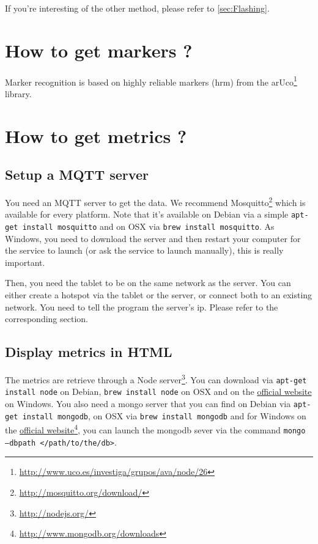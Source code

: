 \documentclass[a4paper,11pt]{report}
\begin{document}
If you're interesting of the other method, please refer to \ref{sec:Flashing}.

\section{How to get markers ?}

Marker recognition is based on highly reliable markers (hrm) from the
arUco\footnote{\url{http://www.uco.es/investiga/grupos/ava/node/26}}
library.

\section{How to get metrics ?}

\subsection{Setup a MQTT server}

You need an MQTT server to get the data. We recommend
Mosquitto\footnote{\url{http://mosquitto.org/download/}} which is available for every
platform. Note that it's available on Debian via a simple \texttt{apt-get install
mosquitto} and on OSX via \texttt{brew install mosquitto}. As Windows, you need to
download the server and then restart your computer for the service to launch (or ask the
service to launch manually), this is really important.

Then, you need the tablet to be on the same network as the server. You can
either create a hotspot via the tablet or the server, or connect both to an
existing network. You need to tell the program the server's ip. Please refer
to the corresponding section.

\subsection{Display metrics in HTML}

The metrics are retrieve through a Node
server\footnote{\url{http://nodejs.org/}}. You can download via \texttt{apt-get
install node} on Debian, \texttt{brew install node} on OSX and on the
\href{http://nodejs.org}{official website} on Windows. You also need a mongo
server that you can find on Debian via \texttt{apt-get install mongodb}, on OSX
via \texttt{brew install mongodb} and for Windows on the
\href{http://www.mongodb.org/downloads}{official
website}\footnote{\url{http://www.mongodb.org/downloads}}, you can launch the
mongodb sever via the command \texttt{mongo --dbpath </path/to/the/db>}.
\end{document}
